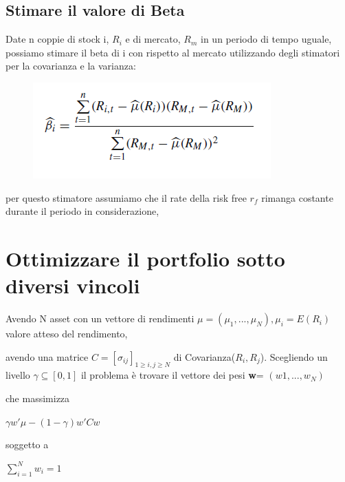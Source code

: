 \documentclass[a4paper,11pt]{report}
\begin{document}
{\subsection{Stimare il  valore di Beta}
	Date n coppie di stock i, $R_i$ e di mercato, $R_m$ in un periodo di tempo uguale, possiamo stimare il beta di i con rispetto al mercato utilizzando degli stimatori per la covarianza e la varianza:
\begin{figure}[h]
  \includegraphics[width=\linewidth]{TheBigBetaFormula.png}
  \label{fig:betaformula}
\end{figure}	
	\newline per questo stimatore assumiamo che il rate della risk free $r_f$ rimanga costante durante il periodo in considerazione,  \newline 

\newpage
 
\section{Ottimizzare il portfolio sotto diversi vincoli}
	Avendo N asset con un vettore di rendimenti $\mu=(\mu_1,...,\mu_N), \mu_i=E(R_i)$ valore atteso del rendimento,

	avendo una matrice $C=[\sigma_{ij}]_{1\geq i, j \geq N} $ di Covarianza($R_i,R_j$). \newline
	Scegliendo un livello $\gamma \subseteq [0,1]$ il problema è trovare il vettore dei pesi \textbf{w}= $(w1,...,w_N)$

	che massimizza
\begin{center}
	$\gamma w' \mu -(1-\gamma)w'Cw$
\end{center}
	soggetto a
\begin{center}
	$\sum\limits_{i=1}^N w_i=1$
\end{center}
}
\end{document}
